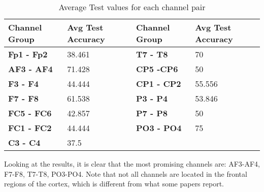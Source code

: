 \begin{table}[H]
\centering
\begin{tabular}{ll|ll}
\textbf{Channel Group} & \textbf{Avg Test Accuracy} & \textbf{Channel Group} & \textbf{Avg Test Accuracy} \\ \hline
\textbf{Fp1 - Fp2}     & 38.461                     & \textbf{T7 - T8}       & 70                         \\
\textbf{AF3 - AF4}     & 71.428                     & \textbf{CP5 -CP6}      & 50                         \\
\textbf{F3 - F4}       & 44.444                     & \textbf{CP1 - CP2}     & 55.556                     \\
\textbf{F7 - F8}       & 61.538                     & \textbf{P3 - P4}       & 53.846                     \\
\textbf{FC5 - FC6}     & 42.857                     & \textbf{P7 - P8}       & 50                         \\
\textbf{FC1 - FC2}     & 44.444                     & \textbf{PO3 - PO4}     & 75                         \\
\textbf{C3 - C4}       & 37.5                       &                        &                           
\end{tabular}
\caption{Average Test values for each channel pair\label{channelSelection}}
\end{table}

Looking at the results, it is clear that the most promising channels are: AF3-AF4, F7-F8, T7-T8, PO3-PO4. Note that not all channels are located in the frontal regions of the cortex, which is different from what some papers report. %